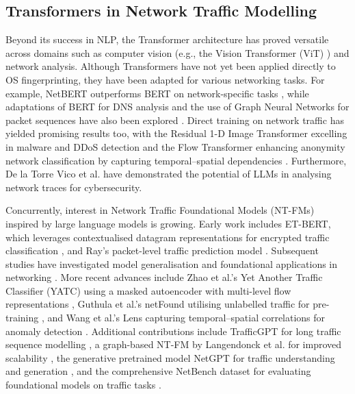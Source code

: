 \subsection{Transformers in Network Traffic Modelling}
\label{subsec:transformers-network-traffic}

Beyond its success in NLP, the Transformer architecture has proved versatile across domains such as computer vision (e.g., the Vision Transformer (ViT) \cite{han_survey_2023}) and network analysis. Although Transformers have not yet been applied directly to OS fingerprinting, they have been adapted for various networking tasks. For example, NetBERT outperforms BERT on network-specific tasks \cite{louis_netbert_2020}, while adaptations of BERT for DNS analysis and the use of Graph Neural Networks for packet sequences have also been explored \cite{le_norbert_2022}. Direct training on network traffic has yielded promising results too, with the Residual 1-D Image Transformer excelling in malware and DDoS detection \cite{barut_r1dit_2023} and the Flow Transformer enhancing anonymity network classification by capturing temporal–spatial dependencies \cite{zhao_flow_2021}. Furthermore, De la Torre Vico et al. \cite{de_la_torre_vico_exploring_2024} have demonstrated the potential of LLMs in analysing network traces for cybersecurity.

Concurrently, interest in Network Traffic Foundational Models (NT-FMs) inspired by large language models is growing. Early work includes ET-BERT, which leverages contextualised datagram representations for encrypted traffic classification \cite{lin_et-bert_2022}, and Ray’s packet-level traffic prediction model \cite{ray_advancing_2022}. Subsequent studies have investigated model generalisation \cite{dietmuller_new_2022} and foundational applications in networking \cite{le_rethinking_2022}. More recent advances include Zhao et al.’s Yet Another Traffic Classifier (YATC) using a masked autoencoder with multi-level flow representations \cite{zhao_yet_2023}, Guthula et al.’s netFound utilising unlabelled traffic for pre-training \cite{guthula_netfound_2023}, and Wang et al.’s Lens capturing temporal–spatial correlations for anomaly detection \cite{wang_lens_2024}. Additional contributions include TrafficGPT for long traffic sequence modelling \cite{qu_trafficgpt_2024}, a graph-based NT-FM by Langendonck et al. for improved scalability \cite{van_langendonck_towards_2024}, the generative pretrained model NetGPT for traffic understanding and generation \cite{meng_netgpt_2023}, and the comprehensive NetBench dataset for evaluating foundational models on traffic tasks \cite{qian_netbench_2024}.
